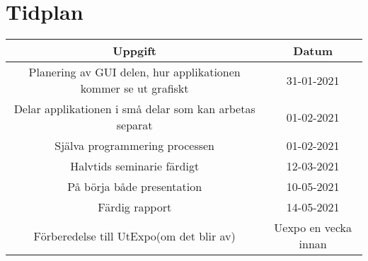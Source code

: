 \documentclass{article}
\begin{document}
\section{Tidplan} 
\begin{center}
    \begin{tabular}{|c|c|}
    \hline
        \textbf {Uppgift} &  \textbf{Datum} \\
        \hline
        Planering av GUI delen, hur applikationen kommer se ut grafiskt & 31-01-2021 \\
        \hline
        Delar applikationen i små delar som kan arbetas separat & 01-02-2021\\
        \hline
        Själva programmering processen & 01-02-2021\\
        \hline
        Halvtids seminarie färdigt & 12-03-2021\\
        \hline
        På börja både presentation  & 10-05-2021 \\
        \hline
        Färdig rapport & 14-05-2021\\
        \hline
        Förberedelse till UtExpo(om det blir av) & Uexpo en vecka innan \\
    \hline
    \end{tabular}
\end{center}
\end{document}
